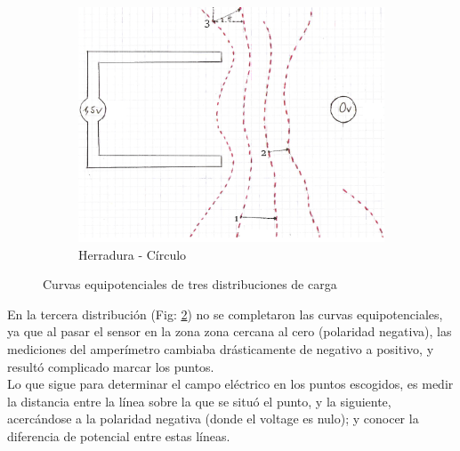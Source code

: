\documentclass[10pt,twocolumn]{article}
\begin{document}
\begin{figure}[H]
  \vspace{8mm}
  \begin{subfigure}[b]{0.80\linewidth}
    \includegraphics[width=\textwidth]{herradura_es.png}
    \caption{Herradura - Círculo}\label{fig:herradura}
  \end{subfigure}
  \caption{Curvas equipotenciales de tres distribuciones de carga}
\end{figure}
En la tercera distribución (Fig: \ref{fig:herradura}) no se completaron las curvas equipotenciales, ya que al pasar el sensor en la zona zona cercana al cero (polaridad negativa), las mediciones del amperímetro cambiaba drásticamente de negativo a positivo, y resultó complicado marcar los puntos.\\

  Lo que sigue para determinar el campo eléctrico en los puntos escogidos, es medir la distancia entre la línea sobre la que se situó el punto, y la siguiente, acercándose a la polaridad negativa (donde el voltage es nulo); y conocer la diferencia de potencial entre estas líneas.
\end{document}
